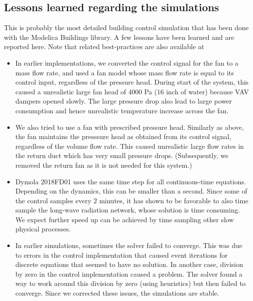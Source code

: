 \documentclass[letterpaper,10pt, openany,english]{sphinxmanual}
\begin{document}
\subsection{Lessons learned regarding the simulations}
\label{\detokenize{example:lessons-learned-regarding-the-simulations}}
This is probably the most detailed building control simulation that
has been done with the Modelica Buildings library. A few lessons
have been learned and are reported here. Note that related best-practices
are also available at 
\begin{itemize}
\item {} 
 In earlier implementations, we
converted the control signal for the fan to a mass flow rate, and used a fan
model whose mass flow rate is equal to its control input, regardless of the pressure head.
During start of the system, this caused a unrealistic large fan head
of \(4000\) Pa (\(16\) inch of water) because
VAV dampers opened slowly.
The large pressure drop also lead to large power consumption and hence unrealistic
temperature increase across the fan.

\item {} 
 We also tried to use a fan with prescribed pressure head.
Similarly as above, the fan maintains the presssure head as obtained from its
control signal, regardless of the volume flow rate.
This caused unrealistic large flow rates in the return duct
which has very small pressure drops. (Subsequently, we removed the return fan
as it is not needed for this system.)

\item {} 
 Dymola 2018FD01 uses the same
time step for all continuous-time equations. Depending on the dynamics, this
can be smaller than a second. Since some of the control samples every
\(2\) minutes, it has shown to be favorable to also time sample the long-wave
radiation network, whose solution is time consuming.
We expect further speed up can be achieved by time
sampling other slow physical processes.

\item {} 
 In earlier simulations, sometimes the solver failed to converge.
This was due to errors in the control implementation that caused event iterations
for discrete equations that seemed to have no solution.
In another case, division by zero in the control implementation caused a problem.
The solver found a way to work around this division by zero
(using heuristics) but then failed to converge.
Since we corrected these issues, the simulations are stable.


\end{itemize}
\end{document}
